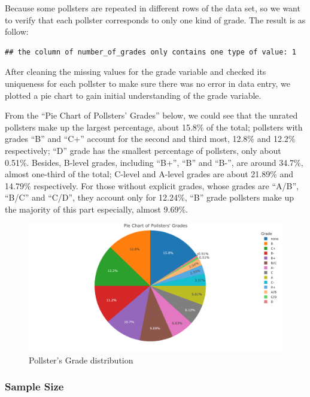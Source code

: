 \documentclass[
  12pt,
]{article}
\begin{document}
Because some pollsters are repeated in different rows of the data set,
so we want to verify that each pollster corresponds to only one kind of
grade. The result is as follow:

\begin{verbatim}
## the column of number_of_grades only contains one type of value: 1
\end{verbatim}

After cleaning the missing values for the grade variable and checked its
uniqueness for each pollster to make sure there was no error in data
entry, we plotted a pie chart to gain initial understanding of the grade
variable.

From the ``Pie Chart of Pollsters' Grades'' below, we could see that the
unrated pollsters make up the largest percentage, about 15.8\% of the
total; pollsters with grades ``B'' and ``C+'' account for the second and
third most, 12.8\% and 12.2\% respectively; ``D'' grade has the smallest
percentage of pollsters, only about 0.51\%. Besides, B-level grades,
including ``B+'', ``B'' and ``B-'', are around 34.7\%, almost one-third
of the total; C-level and A-level grades are about 21.89\% and 14.79\%
respectively. For those without explicit grades, whose grades are
``A/B'', ``B/C'' and ``C/D'', they account only for 12.24\%, ``B'' grade
pollsters make up the majority of this part especially, almost 9.69\%.

\begin{figure}
\centering
\includegraphics{./Figures/piechart.png}
\caption{Pollster's Grade distribution}
\end{figure}

\hypertarget{sample-size}{%
\subsubsection{Sample Size}\label{sample-size}}
\end{document}
